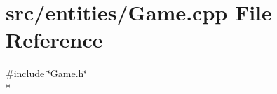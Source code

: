 \section{src/entities/\-Game.cpp File Reference}
\label{_game_8cpp}
{\ttfamily \#include \char`\"{}Game.\-h\char`\"{}}\\*
